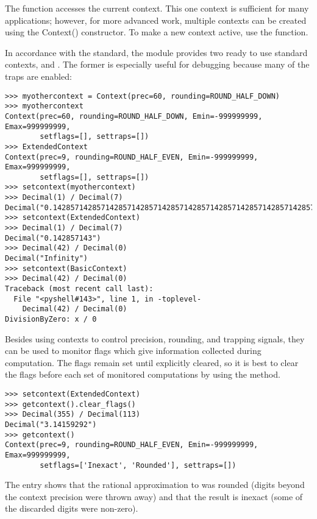 The  function accesses the current context.  This one
context is sufficient for many applications; however, for more advanced work,
multiple contexts can be created using the Context() constructor.  To make a
new context active, use the  function.

In accordance with the standard, the  module provides two
ready to use standard contexts,  and
. The former is especially useful for debugging
because many of the traps are enabled:

\begin{verbatim}
>>> myothercontext = Context(prec=60, rounding=ROUND_HALF_DOWN)
>>> myothercontext
Context(prec=60, rounding=ROUND_HALF_DOWN, Emin=-999999999, Emax=999999999,
        setflags=[], settraps=[])
>>> ExtendedContext
Context(prec=9, rounding=ROUND_HALF_EVEN, Emin=-999999999, Emax=999999999,
        setflags=[], settraps=[])
>>> setcontext(myothercontext)
>>> Decimal(1) / Decimal(7)
Decimal("0.142857142857142857142857142857142857142857142857142857142857")
>>> setcontext(ExtendedContext)
>>> Decimal(1) / Decimal(7)
Decimal("0.142857143")
>>> Decimal(42) / Decimal(0)
Decimal("Infinity")
>>> setcontext(BasicContext)
>>> Decimal(42) / Decimal(0)
Traceback (most recent call last):
  File "<pyshell#143>", line 1, in -toplevel-
    Decimal(42) / Decimal(0)
DivisionByZero: x / 0
\end{verbatim}

Besides using contexts to control precision, rounding, and trapping signals,
they can be used to monitor flags which give information collected during
computation.  The flags remain set until explicitly cleared, so it is best to
clear the flags before each set of monitored computations by using the
 method.

\begin{verbatim}
>>> setcontext(ExtendedContext)
>>> getcontext().clear_flags()
>>> Decimal(355) / Decimal(113)
Decimal("3.14159292")
>>> getcontext()
Context(prec=9, rounding=ROUND_HALF_EVEN, Emin=-999999999, Emax=999999999,
        setflags=['Inexact', 'Rounded'], settraps=[])
\end{verbatim}

The  entry shows that the rational approximation to
 was rounded (digits beyond the context precision were thrown
away) and that the result is inexact (some of the discarded digits were
non-zero).

